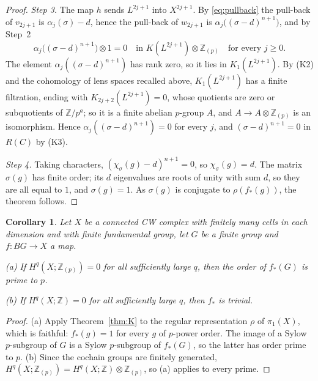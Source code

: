 \documentclass[11pt,a4paper]{article}
\newtheorem{corollary}[theorem]{Corollary}
\theoremstyle{definition}
\newcommand{\Z}{\mathbb{Z}}
\newcommand{\Zp}{\Z_{(p)}}
\newcommand{\sk}[2]{#1^{#2}}
\begin{document}
\begin{proof}
\emph{Step 3.} The map $h$ sends $\sk{L}{2j+1}$ into $\sk{X}{2j+1}$. By
\eqref{eq:pullback} the pull-back of $v_{2j+1}$ is $\alpha_j(\sigma)-d$,
hence the pull-back of $w_{2j+1}$ is $\alpha_j\bigl((\sigma-d)^{n+1}\bigr)$,
and by Step~2
\[
 \alpha_j\bigl((\sigma-d)^{n+1}\bigr)\otimes1=0\quad\text{in }
 K(\sk{L}{2j+1})\otimes\Zp\quad\text{for every }j\ge0.
\]
The element $\alpha_j((\sigma-d)^{n+1})$ has rank zero, so it lies in
$K_1(\sk{L}{2j+1})$. By (K2) and the cohomology of lens spaces recalled
above, $K_1(\sk{L}{2j+1})$ has a finite filtration, ending with
$K_{2j+2}(\sk{L}{2j+1})=0$, whose quotients are zero or subquotients of
$\Z/p^a$; so it is a finite abelian $p$-group $A$, and $A\to A\otimes\Zp$ is
an isomorphism. Hence $\alpha_j((\sigma-d)^{n+1})=0$ for every $j$, and
$(\sigma-d)^{n+1}=0$ in $R(C)$ by (K3).

\emph{Step 4.} Taking characters, $(\chi_\sigma(g)-d)^{n+1}=0$, so
$\chi_\sigma(g)=d$. The matrix $\sigma(g)$ has finite order; its $d$
eigenvalues are roots of unity with sum $d$, so they are all equal to $1$,
and $\sigma(g)=1$. As $\sigma(g)$ is conjugate to $\rho(f_*(g))$, the theorem
follows.
\end{proof}

\begin{corollary}\label{cor:finitepi}
Let $X$ be a connected CW complex with finitely many cells in each dimension
and with finite fundamental group, let $G$ be a finite group and
$f\colon BG\to X$ a map.

\textup{(a)} If $H^q(X;\Zp)=0$ for all sufficiently large $q$, then the order
of $f_*(G)$ is prime to $p$.

\textup{(b)} If $H^q(X;\Z)=0$ for all sufficiently large $q$, then $f_*$ is
trivial.
\end{corollary}

\begin{proof}
(a) Apply Theorem~\ref{thm:K} to the regular representation $\rho$ of
$\pi_1(X)$, which is faithful: $f_*(g)=1$ for every $g$ of $p$-power order.
The image of a Sylow $p$-subgroup of $G$ is a Sylow $p$-subgroup of $f_*(G)$,
so the latter has order prime to $p$. (b) Since the cochain groups are
finitely generated, $H^q(X;\Zp)=H^q(X;\Z)\otimes\Zp$, so (a) applies to every
prime.
\end{proof}
\end{document}
